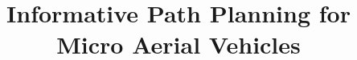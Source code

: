 \documentclass[10pt,twoside,a4paper]{article}
\begin{document}
\title{Informative Path Planning for Micro Aerial Vehicles}


\maketitle
\pagestyle{plain}

                                                                
                                                                
                                                                

\cleardoublepage

\pagestyle{fancy}






%



\end{document}
